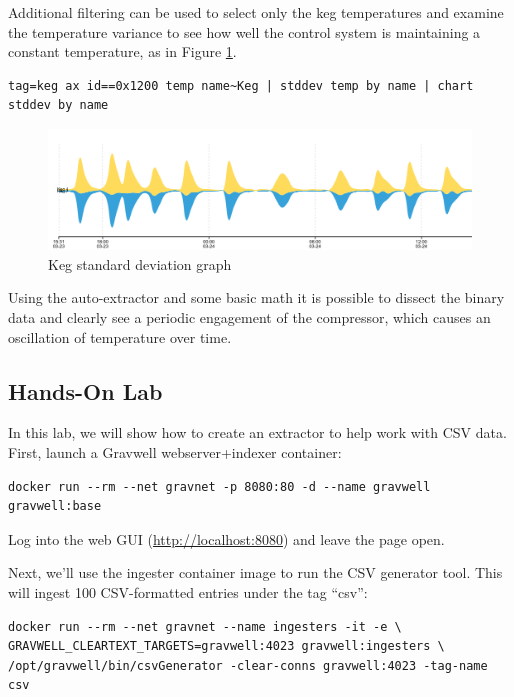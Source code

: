 Additional filtering can be used to select only the keg temperatures
and examine the temperature variance to see how well the control system
is maintaining a constant temperature, as in Figure \ref{fig:keg-stddev}.

\begin{Verbatim}[breaklines=true]
tag=keg ax id==0x1200 temp name~Keg | stddev temp by name | chart stddev by name
\end{Verbatim}

\begin{figure}
	\includegraphics{images/keg-stddev.png}
	\caption{Keg standard deviation graph}
	\label{fig:keg-stddev}
\end{figure}

Using the auto-extractor and some basic math it is possible to dissect
the binary data and clearly see a periodic engagement of the compressor,
which causes an oscillation of temperature over time.

\subsection{Hands-On Lab}

In this lab, we will show how to create an extractor to help work with
CSV data. First, launch a Gravwell webserver+indexer container:

\begin{Verbatim}[breaklines=true]
docker run --rm --net gravnet -p 8080:80 -d --name gravwell gravwell:base
\end{Verbatim}

Log into the web GUI (\href{http://localhost:8080}{http://localhost:8080}) and leave the page open.

Next, we'll use the ingester container image to run the CSV generator
tool. This will ingest 100 CSV-formatted entries under the tag ``csv'':

\begin{Verbatim}[breaklines=true]
docker run --rm --net gravnet --name ingesters -it -e \
GRAVWELL_CLEARTEXT_TARGETS=gravwell:4023 gravwell:ingesters \
/opt/gravwell/bin/csvGenerator -clear-conns gravwell:4023 -tag-name csv
\end{Verbatim}

